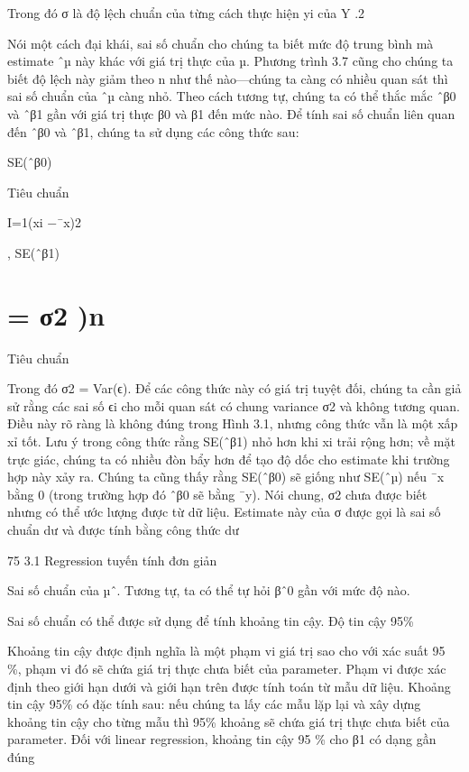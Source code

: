 Trong đó σ là độ lệch chuẩn của từng cách thực hiện yi của Y .2

Nói một cách đại khái, sai số chuẩn cho chúng ta biết mức độ trung bình mà estimate ˆµ này khác với giá trị thực của µ. Phương trình 3.7 cũng cho chúng ta biết độ lệch này giảm theo n như thế nào—chúng ta càng có nhiều quan sát thì sai số chuẩn của ˆµ càng nhỏ. Theo cách tương tự, chúng ta có thể thắc mắc ˆβ0 và ˆβ1 gần với giá trị thực β0 và β1 đến mức nào. Để tính sai số chuẩn liên quan đến ˆβ0 và ˆβ1, chúng ta sử dụng các công thức sau:

SE(ˆβ0)

Tiêu chuẩn

I=1(xi −¯x)2

, SE(ˆβ1)

\section{= σ2 )n}

Tiêu chuẩn

Trong đó σ2 = Var(ϵ). Để các công thức này có giá trị tuyệt đối, chúng ta cần giả sử rằng các sai số ϵi cho mỗi quan sát có chung variance σ2 và không tương quan. Điều này rõ ràng là không đúng trong Hình 3.1, nhưng công thức vẫn là một xấp xỉ tốt. Lưu ý trong công thức rằng SE(ˆβ1) nhỏ hơn khi xi trải rộng hơn; về mặt trực giác, chúng ta có nhiều đòn bẩy hơn để tạo độ dốc cho estimate khi trường hợp này xảy ra. Chúng ta cũng thấy rằng SE(ˆβ0) sẽ giống như SE(ˆµ) nếu ¯x bằng 0 (trong trường hợp đó ˆβ0 sẽ bằng ¯y). Nói chung, σ2 chưa được biết nhưng có thể ước lượng được từ dữ liệu. Estimate này của σ được gọi là sai số chuẩn dư và được tính bằng công thức dư

75 3.1 Regression tuyến tính đơn giản

Sai số chuẩn của µˆ. Tương tự, ta có thể tự hỏi βˆ0 gần với mức độ nào.

Sai số chuẩn có thể được sử dụng để tính khoảng tin cậy. Độ tin cậy 95\%

Khoảng tin cậy được định nghĩa là một phạm vi giá trị sao cho với xác suất 95 \%, phạm vi đó sẽ chứa giá trị thực chưa biết của parameter. Phạm vi được xác định theo giới hạn dưới và giới hạn trên được tính toán từ mẫu dữ liệu. Khoảng tin cậy 95\% có đặc tính sau: nếu chúng ta lấy các mẫu lặp lại và xây dựng khoảng tin cậy cho từng mẫu thì 95\% khoảng sẽ chứa giá trị thực chưa biết của parameter. Đối với linear regression, khoảng tin cậy 95 \% cho β1 có dạng gần đúng

